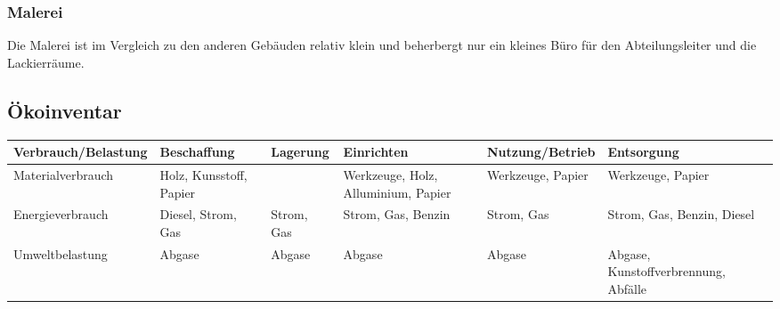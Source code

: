 \subsubsection{Malerei}
Die Malerei ist im Vergleich zu den anderen Gebäuden relativ klein und
beherbergt nur ein kleines Büro für den Abteilungsleiter und die Lackierräume.

\begin{landscape}

\section{Ökoinventar}
\vfill
\begin{table}[h]
    \begin{tabular}{ |m{3.5cm}|m{2.5cm}|m{2.5cm}|m{3cm}|m{3cm}|m{3.5cm}| }
\hline
\rowcolor[gray]{0.9}\textbf{Verbrauch/Belastung} & \textbf{Beschaffung} &
\textbf{Lagerung} & 
\textbf{Einrichten} & \textbf{Nutzung/Betrieb} & \textbf{Entsorgung} \\ \hline
Materialverbrauch & Holz, Kunsstoff, Papier & & Werkzeuge, Holz, Alluminium, Papier & Werkzeuge,
Papier & Werkzeuge, Papier \\ \hline
Energieverbrauch & Diesel, Strom, Gas & Strom, Gas & Strom, Gas, Benzin & Strom, Gas
& Strom, Gas, Benzin, Diesel\\ \hline
Umweltbelastung & Abgase & Abgase & Abgase & Abgase
& Abgase, Kunstoffverbrennung, Abfälle \\
\hline
\end{tabular}
\end{table}
\vfill
\end{landscape}

